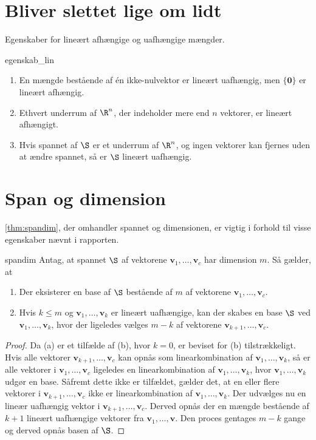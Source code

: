 \chapter{Bliver slettet lige om lidt}
%
Egenskaber for lineært afhængige og uafhængige mængder.
%
\begin{thm}{}{egenskab_lin}
\begin{enumerate}
\item En mængde bestående af én ikke-nulvektor er lineært uafhængig, men $\{\textbf{0}\}$ er lineært afhængig.
\item Ethvert underrum af $\R^n$, der indeholder mere end $n$ vektorer, er lineært afhængigt.
\item Hvis spannet af $\S$ er et underrum af $\R^n$, og ingen vektorer kan fjernes uden at ændre spannet, så er $\S$ lineært uafhængig.
\end{enumerate}
\end{thm}
%
\chapter{Span og dimension}
%
\ref{thm:spandim}, der omhandler spannet og dimensionen, er vigtig i forhold til visse egenskaber nævnt i rapporten.
%
\begin{thm}{}{spandim}
Antag, at spannet $\S$ af vektorene $\textbf{v}_1,\ldots,\textbf{v}_c$ har dimension $m$.
Så gælder, at
\begin{enumerate}[label=(\alph*)]
\item Der eksisterer en base af $\S$ bestående af $m$ af vektorene $\mathbf{v}_1,\ldots,\mathbf{v}_c$.
\item Hvis $k\leq m$ og $\mathbf{v}_1,\ldots,\mathbf{v}_k$ er lineært uafhængige, kan der skabes en base $\S$ ved $\mathbf{v}_1,\ldots,\mathbf{v}_k$, hvor der ligeledes vælges $m-k$ af vektorene $\mathbf{v}_{k+1},\ldots,\textbf{v}_c$.
\end{enumerate}
\end{thm}

\begin{proof}
Da (a) er et tilfælde af (b), hvor $k=0$, er beviset for (b) tilstrækkeligt.
Hvis alle vektorer $\mathbf{v}_{k+1},\ldots,\textbf{v}_c$ kan opnås som linearkombination af $\mathbf{v}_1,\ldots,\mathbf{v}_k$, så er alle vektorer i $\mathbf{v}_{1},\ldots,\textbf{v}_c$ ligeledes en linearkombination af $\mathbf{v}_1,\ldots,\mathbf{v}_k$, hvor $\mathbf{v}_1,\ldots,\mathbf{v}_k$ udgør en base.
Såfremt dette ikke er tilfældet, gælder det, at en eller flere vektorer i $\mathbf{v}_{k+1},\ldots,\textbf{v}_c$ ikke er linearkombination af $\mathbf{v}_1,\ldots,\mathbf{v}_k$. 
Der udvælges nu en lineær uafhængig vektor i $\mathbf{v}_{k+1},\ldots,\textbf{v}_c$.
Derved opnås der en mængde bestående af $k+1$ lineært uafhængige vektorer fra $\mathbf{v}_{1},\ldots,\mathbf{v}$.
Den proces gentages $m-k$ gange og derved opnås basen af $\S$.
\end{proof}
%